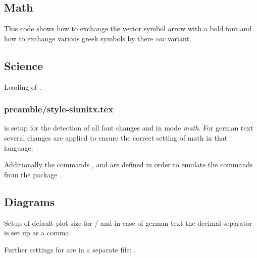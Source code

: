 \subsection{Math}
\label{sec:style:math}

This code shows how to exchange the vector symbol arrow with a bold font and how to exchange various greek symbols by there \emph{var} variant.


\subsection{Science}
\label{sec:style:science}

Loading of .


\subsubsection{preamble/style-siunitx.tex}

 is setup for the detection of all font changes and in mode \emph{math}. For german text several changes are applied to ensure the correct setting of math in that language.

Additionally the commands ,  and  are defined in order to emulate the commands from the package .


\subsection{Diagrams}
\label{sec:style:diagram}

Setup of default plot size for / and in case of german text the decimal separator is set up as a comma.

Further settings for  are in a separate file: 
.

